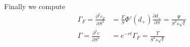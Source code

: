 \documentclass[english,seminar]{pnotes}
\begin{document}
Finally we compute
\begin{equation}
\begin{split}
	\Gamma_F = \frac{\partial^2 c_F}{ \partial S^2} &= \frac{F}{S} \Phi'(d_+) \frac{\partial d_+}{\partial S}  = \frac {\Psi}{ S^2 s \sqrt{t}} \\
	\Gamma = \frac{\partial^2 c}{ \partial S^2} &= e^{-rt} \Gamma_F = \frac {\Upsilon}{ S^2 s \sqrt{ t}}
\end{split}
\end{equation}
\end{document}

